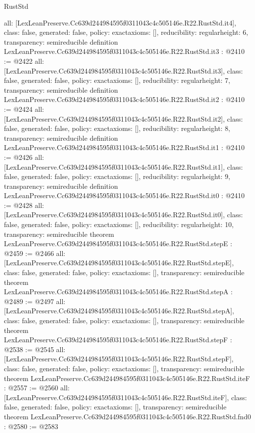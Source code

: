 \begin{lexlean}{RustStd}
\begin{coremodule}
{  all: [LexLeanPreserve.Cc639d244984595f0311043c4c505146e.R22.RustStd.it4],
  class: false,
  generated: false,
  policy: exact{axioms: []},
  reducibility: regular{height: 6},
  transparency: semireducible
}
definition LexLeanPreserve.Cc639d244984595f0311043c4c505146e.R22.RustStd.it3 : @2410 := @2422 {
  all: [LexLeanPreserve.Cc639d244984595f0311043c4c505146e.R22.RustStd.it3],
  class: false,
  generated: false,
  policy: exact{axioms: []},
  reducibility: regular{height: 7},
  transparency: semireducible
}
definition LexLeanPreserve.Cc639d244984595f0311043c4c505146e.R22.RustStd.it2 : @2410 := @2424 {
  all: [LexLeanPreserve.Cc639d244984595f0311043c4c505146e.R22.RustStd.it2],
  class: false,
  generated: false,
  policy: exact{axioms: []},
  reducibility: regular{height: 8},
  transparency: semireducible
}
definition LexLeanPreserve.Cc639d244984595f0311043c4c505146e.R22.RustStd.it1 : @2410 := @2426 {
  all: [LexLeanPreserve.Cc639d244984595f0311043c4c505146e.R22.RustStd.it1],
  class: false,
  generated: false,
  policy: exact{axioms: []},
  reducibility: regular{height: 9},
  transparency: semireducible
}
definition LexLeanPreserve.Cc639d244984595f0311043c4c505146e.R22.RustStd.it0 : @2410 := @2428 {
  all: [LexLeanPreserve.Cc639d244984595f0311043c4c505146e.R22.RustStd.it0],
  class: false,
  generated: false,
  policy: exact{axioms: []},
  reducibility: regular{height: 10},
  transparency: semireducible
}
theorem LexLeanPreserve.Cc639d244984595f0311043c4c505146e.R22.RustStd.stepE : @2459 := @2466 {
  all: [LexLeanPreserve.Cc639d244984595f0311043c4c505146e.R22.RustStd.stepE],
  class: false,
  generated: false,
  policy: exact{axioms: []},
  transparency: semireducible
}
theorem LexLeanPreserve.Cc639d244984595f0311043c4c505146e.R22.RustStd.stepA : @2489 := @2497 {
  all: [LexLeanPreserve.Cc639d244984595f0311043c4c505146e.R22.RustStd.stepA],
  class: false,
  generated: false,
  policy: exact{axioms: []},
  transparency: semireducible
}
theorem LexLeanPreserve.Cc639d244984595f0311043c4c505146e.R22.RustStd.stepF : @2538 := @2545 {
  all: [LexLeanPreserve.Cc639d244984595f0311043c4c505146e.R22.RustStd.stepF],
  class: false,
  generated: false,
  policy: exact{axioms: []},
  transparency: semireducible
}
theorem LexLeanPreserve.Cc639d244984595f0311043c4c505146e.R22.RustStd.iteF : @2557 := @2560 {
  all: [LexLeanPreserve.Cc639d244984595f0311043c4c505146e.R22.RustStd.iteF],
  class: false,
  generated: false,
  policy: exact{axioms: []},
  transparency: semireducible
}
theorem LexLeanPreserve.Cc639d244984595f0311043c4c505146e.R22.RustStd.fnd0 : @2580 := @2583 {
}
\end{coremodule}
\end{lexlean}
